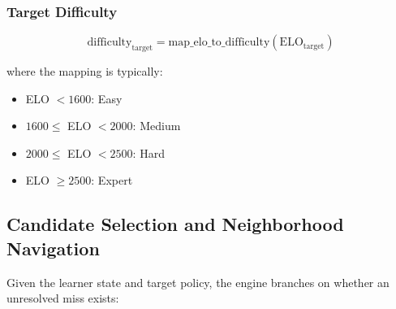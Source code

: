 \documentclass[sigconf,authordraft,twoside]{acmart}
\begin{document}
\subsubsection{Target Difficulty}
\begin{equation}
\text{difficulty}_{\text{target}} = \text{map\_elo\_to\_difficulty}(\text{ELO}_{\text{target}})
\end{equation}

where the mapping is typically:
\begin{itemize}
\item ELO $< 1600$: Easy
\item $1600 \le$ ELO $< 2000$: Medium
\item $2000 \le$ ELO $< 2500$: Hard
\item ELO $\geq 2500$: Expert
\end{itemize}

\subsection{Candidate Selection and Neighborhood Navigation}

Given the learner state and target policy, the engine branches on whether an unresolved miss exists:
\end{document}
